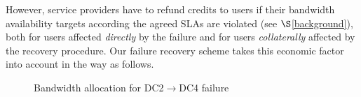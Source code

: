 \documentclass[sigconf]{acmart}
\begin{document}
However, service providers have to refund credits to users if their bandwidth availability targets according the agreed SLAs are violated (see $\S$\ref{background}), both for users affected \textit{directly} by the failure and for users \textit{collaterally} affected by the recovery procedure. 
Our failure recovery scheme takes this economic factor into account in the way as follows.
%
%
%
\begin{figure}[t]
\centering
{}
\caption{Bandwidth allocation for DC2$\to$DC4 failure}
\label{recovery}
\end{figure}
\end{document}
